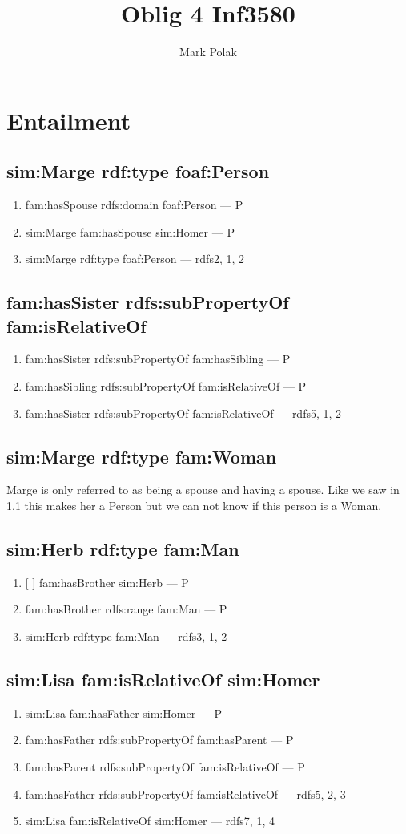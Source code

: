 \documentclass[12pt]{paper}
\title{Oblig 4 Inf3580}
\author{Mark Polak}
\begin{document}
\newpage
\section{Entailment}
\subsection{sim:Marge rdf:type foaf:Person}
\begin{enumerate}
\item fam:hasSpouse rdfs:domain foaf:Person --- P
\item sim:Marge fam:hasSpouse sim:Homer --- P
\item sim:Marge rdf:type foaf:Person --- rdfs2, 1, 2
\end{enumerate}

\subsection{fam:hasSister rdfs:subPropertyOf fam:isRelativeOf}
\begin{enumerate}
\item fam:hasSister rdfs:subPropertyOf fam:hasSibling --- P
\item fam:hasSibling rdfs:subPropertyOf fam:isRelativeOf --- P
\item fam:hasSister rdfs:subPropertyOf fam:isRelativeOf --- rdfs5, 1, 2
\end{enumerate}

\subsection{sim:Marge rdf:type fam:Woman}
Marge is only referred to as being a spouse and having a spouse. Like we saw in 1.1 this makes her a Person but we can not know if this person is a Woman.

\subsection{sim:Herb rdf:type fam:Man}
\begin{enumerate}
\item {[ ]} fam:hasBrother sim:Herb --- P
\item fam:hasBrother rdfs:range fam:Man --- P
\item sim:Herb rdf:type fam:Man --- rdfs3, 1, 2
\end{enumerate}

\subsection{sim:Lisa fam:isRelativeOf sim:Homer}
\begin{enumerate}
\item sim:Lisa fam:hasFather sim:Homer --- P
\item fam:hasFather rdfs:subPropertyOf fam:hasParent --- P
\item fam:hasParent rdfs:subPropertyOf fam:isRelativeOf --- P
\item fam:hasFather rfds:subPropertyOf fam:isRelativeOf --- rdfs5, 2, 3
\item sim:Lisa fam:isRelativeOf sim:Homer --- rdfs7, 1, 4
\end{enumerate}
\end{document}
